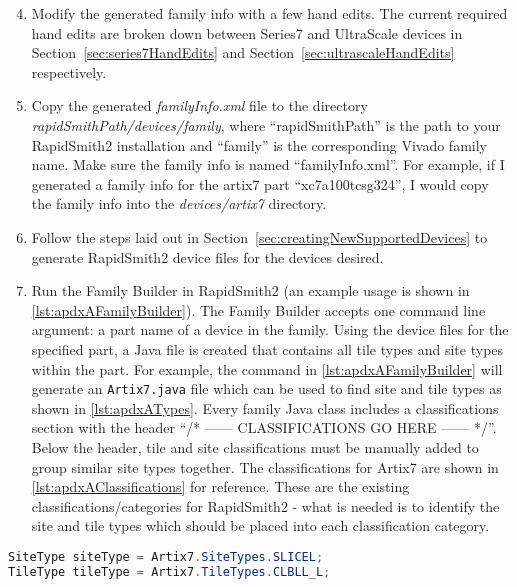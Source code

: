 \begin{enumerate}
\setcounter{enumi}{3}    
    \item Modify the generated family info with a few hand edits. The
    current required hand edits are broken down between Series7 and UltraScale
    devices in
    Section~\ref{sec:series7HandEdits} and Section~\ref{sec:ultrascaleHandEdits}
    respectively.

	\item Copy the generated \textit{familyInfo.xml} file to the directory
	\textit{rapidSmithPath/devices/family}, where ``rapidSmithPath'' is the path to
	your RapidSmith2 installation and ``family'' is the corresponding Vivado family
	name. Make sure the family info is named ``familyInfo.xml''. For example, if I
	generated a family info for the artix7 part ``xc7a100tcsg324'', I would copy
	the family info into the \textit{devices/artix7} directory.

	\item Follow the steps laid out in Section~\ref{sec:creatingNewSupportedDevices} to
	generate RapidSmith2 device files for the devices desired.
	    
	\item Run the Family Builder in RapidSmith2 (an example usage is shown in
	\autoref{lst:apdxAFamilyBuilder}). The Family Builder accepts one command line
	argument: a part name of a device in the family. Using the device files for
	the specified part, a Java file is created that contains all tile types and
	site types within the part. For example, the command in
	\autoref{lst:apdxAFamilyBuilder} will generate an \texttt{Artix7.java} file
	which can be used to find site and tile types as shown in
	\autoref{lst:apdxATypes}. Every family Java class includes a classifications
	section with the header ``/* ------ CLASSIFICATIONS GO HERE ------ */''. Below
	the header, tile and site classifications must be manually added to group
	similar site types together. The classifications for Artix7 are shown in
	\autoref{lst:apdxAClassifications} for reference.  These are the existing
	classifications/categories for RapidSmith2 - what is needed is to identify the
	site and tile types which should be placed into each classification category.
	
\end{enumerate}

\begin{lstlisting}[language=java,numbers=none, caption=How to access SiteTypes
and TileTypes in RapidSmith2, label=lst:apdxATypes] 
SiteType siteType = Artix7.SiteTypes.SLICEL; 
TileType tileType = Artix7.TileTypes.CLBLL_L;
\end{lstlisting}

